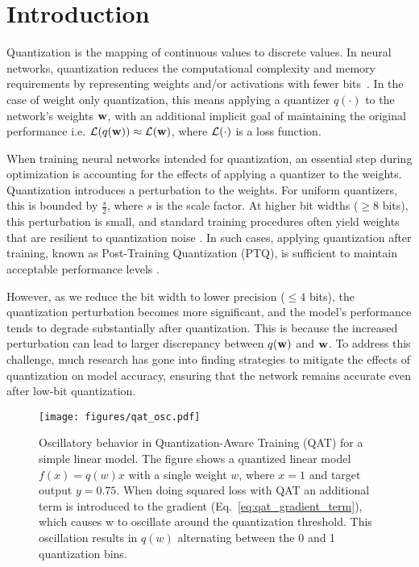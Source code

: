 
\section{Introduction}
Quantization is the mapping of continuous values to discrete values. In neural networks, quantization reduces the computational complexity and memory requirements by representing weights and/or activations with fewer bits~\cite{gupta15limited}. In the case of weight only quantization, this means applying a quantizer \( q(\cdot) \) to the network's weights \( \mathbf{w} \), with an additional implicit goal of maintaining the original performance i.e. \( \mathcal{L}(q(\mathbf{w})) \approx \mathcal{L}(\mathbf{w}) \), where $\mathcal{L}(\cdot)$ is a loss function.

When training neural networks intended for quantization, an essential step during optimization is accounting for the effects of applying a quantizer to the weights. Quantization introduces a perturbation to the weights. For uniform quantizers, this is bounded by \( \frac{s}{2} \), where \( s \) is the scale factor. At higher bit widths (\( \geq 8 \) bits), this perturbation is small, and standard training procedures often yield weights that are resilient to quantization noise \cite{nagel2021white}. In such cases, applying quantization after training, known as Post-Training Quantization (PTQ), is sufficient to maintain acceptable performance levels \cite{nagel2021white}.

However, as we reduce the bit width to lower precision (\( \leq 4 \) bits), the quantization perturbation becomes more significant, and the model's performance tends to degrade substantially after quantization. This is because the increased perturbation can lead to larger discrepancy between \( q(\mathbf{w}) \) and \( \mathbf{w} \). To address this challenge, much research has gone into finding strategies to mitigate the effects of quantization on model accuracy, ensuring that the network remains accurate even after low-bit quantization.

\begin{figure}[t]
    \centering
\texttt{[image: figures/qat\_osc.pdf]}
    \caption{Oscillatory behavior in Quantization-Aware Training (QAT) for a simple linear model. The figure shows a quantized linear model $f(x) = q(w)x$ with a single weight $w$, where $x = 1$ and target output $y = 0.75$. When doing squared loss with QAT an additional term is introduced to the gradient (Eq.~\ref{eq:qat_gradient_term}), 
    which causes
    w to oscillate around the quantization threshold. This oscillation results in $q(w)$ alternating between the 0 and 1 quantization bins.
    }
    \label{fig:intro}
\end{figure}

